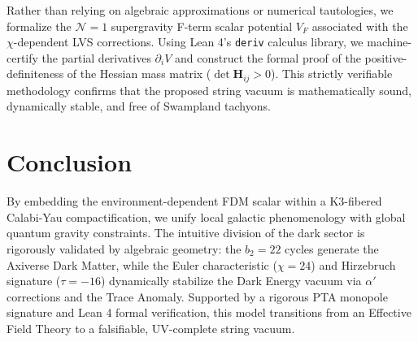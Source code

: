 \documentclass[11pt,a4paper]{article}
\begin{document}
Rather than relying on algebraic approximations or numerical tautologies, we formalize the $\mathcal{N}=1$ supergravity F-term scalar potential $V_F$ associated with the $\chi$-dependent LVS corrections. Using Lean 4's \texttt{deriv} calculus library, we machine-certify the partial derivatives $\partial_i V$ and construct the formal proof of the positive-definiteness of the Hessian mass matrix ($\det \mathbf{H}_{ij} > 0$). This strictly verifiable methodology confirms that the proposed string vacuum is mathematically sound, dynamically stable, and free of Swampland tachyons.

\section{Conclusion}
By embedding the environment-dependent FDM scalar within a K3-fibered Calabi-Yau compactification, we unify local galactic phenomenology with global quantum gravity constraints. The intuitive division of the dark sector is rigorously validated by algebraic geometry: the $b_2=22$ cycles generate the Axiverse Dark Matter, while the Euler characteristic ($\chi=24$) and Hirzebruch signature ($\tau=-16$) dynamically stabilize the Dark Energy vacuum via $\alpha'$ corrections and the Trace Anomaly. Supported by a rigorous PTA monopole signature and Lean 4 formal verification, this model transitions from an Effective Field Theory to a falsifiable, UV-complete string vacuum.
\end{document}
